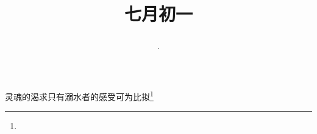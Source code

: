 \title{\date[d=4,m=8,y=2024][year:cn-y,年,month:cn,day:cn,日,·,weekday]·七月初一 }
灵魂的渴求只有溺水者的感受可为比拟\footnote{ }


